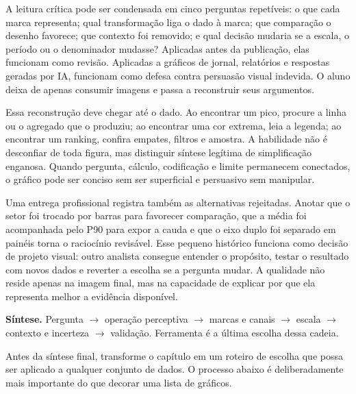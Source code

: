 A leitura crítica pode ser condensada em cinco perguntas repetíveis: o que cada marca representa; qual transformação liga o dado à marca; que comparação o desenho favorece; que contexto foi removido; e qual decisão mudaria se a escala, o período ou o denominador mudasse? Aplicadas antes da publicação, elas funcionam como revisão. Aplicadas a gráficos de jornal, relatórios e respostas geradas por IA, funcionam como defesa contra persuasão visual indevida. O aluno deixa de apenas consumir imagens e passa a reconstruir seus argumentos.

Essa reconstrução deve chegar até o dado. Ao encontrar um pico, procure a linha ou o agregado que o produziu; ao encontrar uma cor extrema, leia a legenda; ao encontrar um ranking, confira empates, filtros e amostra. A habilidade não é desconfiar de toda figura, mas distinguir síntese legítima de simplificação enganosa. Quando pergunta, cálculo, codificação e limite permanecem conectados, o gráfico pode ser conciso sem ser superficial e persuasivo sem manipular.

Uma entrega profissional registra também as alternativas rejeitadas. Anotar que o setor foi trocado por barras para favorecer comparação, que a média foi acompanhada pelo P90 para expor a cauda e que o eixo duplo foi separado em painéis torna o raciocínio revisável. Esse pequeno histórico funciona como decisão de projeto visual: outro analista consegue entender o propósito, testar o resultado com novos dados e reverter a escolha se a pergunta mudar. A qualidade não reside apenas na imagem final, mas na capacidade de explicar por que ela representa melhor a evidência disponível.

\begin{SummaryBox}
\textbf{Síntese.} Pergunta $\rightarrow$ operação perceptiva $\rightarrow$ marcas e canais $\rightarrow$ escala $\rightarrow$ contexto e incerteza $\rightarrow$ validação. Ferramenta é a última escolha dessa cadeia.
\end{SummaryBox}


Antes da síntese final, transforme o capítulo em um roteiro de escolha que possa ser aplicado a qualquer conjunto de dados. O processo abaixo é deliberadamente mais importante do que decorar uma lista de gráficos.

